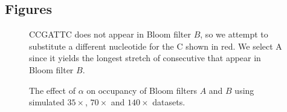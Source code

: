 \documentclass{bmcart}
\def\texttt{[image: ]}
\begin{document}
\begin{backmatter}

\section*{Figures}
\begin{figure}[h!]%
\caption{}
\end{figure}

\begin{figure}[h!] %
\begin{center} 
\caption{  \kmer CCGATTC does not appear in Bloom filter $B$, so we attempt to substitute a different nucleotide for the C shown in red.  We select A since it yields the longest stretch of consecutive \kmers that appear in Bloom filter $B$. }
\end{center}
\end{figure}

\begin{figure}[h!] %
\begin{center}
\caption{}
\end{center}
\end{figure}

\begin{figure}[h!] %
\begin{center}
\caption{ The effect of $\alpha$ on occupancy of Bloom filters $A$ and $B$ using simulated $35\times$, $70\times$ and $140\times$ datasets.}
\end{center}
\end{figure}

\begin{figure}[h!] %
\begin{center}
\caption{}
\end{center}
\end{figure}


\end{backmatter}
\end{document}
